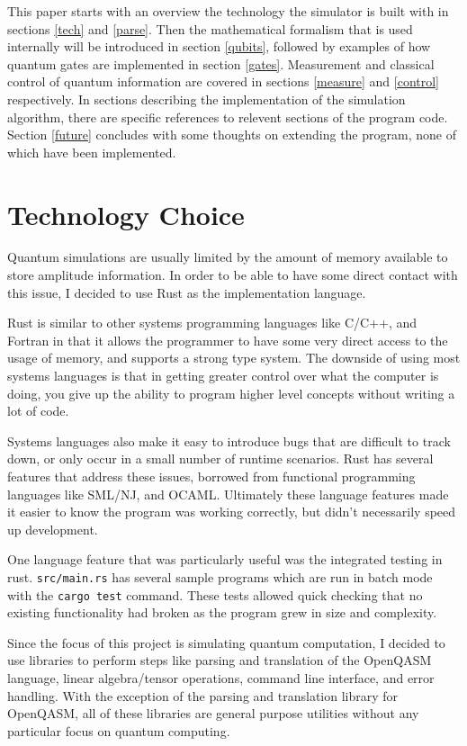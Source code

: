 \documentclass[%
 reprint,
 amsmath,amssymb,
 aps,
]{revtex4-2}
\begin{document}
This paper starts with an overview the technology the simulator is built with in sections \ref{tech} and \ref{parse}. Then the mathematical formalism that is used internally will be introduced in section \ref{qubits}, followed by examples of how quantum gates are implemented in section \ref{gates}. Measurement and classical control of quantum information are covered in sections \ref{measure} and \ref{control} respectively. In sections describing the implementation of the simulation algorithm, there are specific references to relevent sections of the program code. Section \ref{future} concludes with some thoughts on extending the program, none of which have been implemented.

\section{\label{sec:level1} \label{tech} Technology Choice}
Quantum simulations are usually limited by the amount of memory available to store amplitude information. In order to be able to have some direct contact with this issue, I decided to use Rust as the implementation language. 

Rust is similar to other systems programming languages like C/C++, and Fortran in that it allows the programmer to have some very direct access to the usage of memory, and supports a strong type system. The downside of using most systems languages is that in getting greater control over what the computer is doing, you give up the ability to program higher level concepts without writing a lot of code. 

Systems languages also make it easy to introduce bugs that are difficult to track down, or only occur in a small number of runtime scenarios. Rust has several features that address these issues, borrowed from functional programming languages like SML/NJ, and OCAML. Ultimately these language features made it easier to know the program was working correctly, but didn't necessarily speed up development. 

One language feature that was particularly useful was the integrated testing in rust. \texttt{src/main.rs} has several sample programs which are run in batch mode with the \texttt{cargo test} command. These tests allowed quick checking that no existing functionality had broken as the program grew in size and complexity.

Since the focus of this project is simulating quantum computation, I decided to use libraries to perform steps like parsing and translation of the OpenQASM language, linear algebra/tensor operations, command line interface, and error handling. With the exception of the parsing and translation library for OpenQASM, all of these libraries are general purpose utilities without any particular focus on quantum computing.
\end{document}
